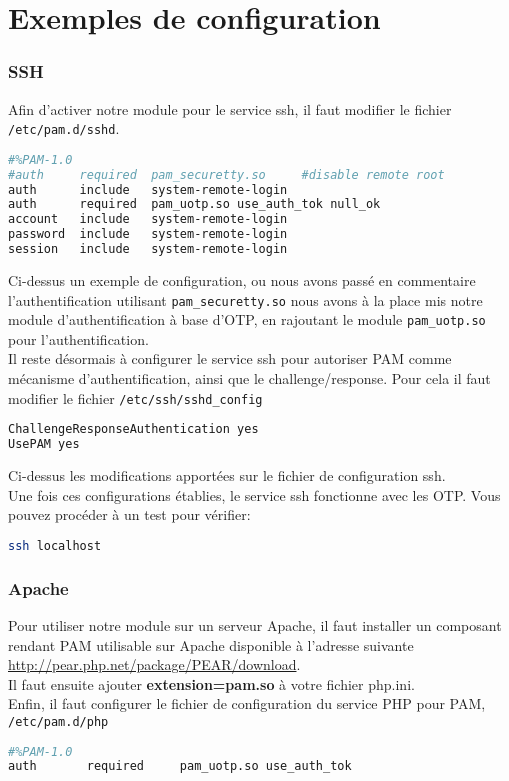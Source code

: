 \documentclass{"../../../res/univ-projet"}
\begin{document}
\newpage

\part{Exemples de configuration}
\section{SSH}
Afin d'activer notre module pour le service ssh, il faut modifier le fichier \verb?/etc/pam.d/sshd?.
\begin{lstlisting}[language=bash, backgroundcolor=\color{black}, basicstyle=\color{white}]
#%PAM-1.0
#auth     required  pam_securetty.so     #disable remote root
auth      include   system-remote-login
auth      required  pam_uotp.so use_auth_tok null_ok
account   include   system-remote-login
password  include   system-remote-login
session   include   system-remote-login
\end{lstlisting}
Ci-dessus un exemple de configuration, ou nous avons passé en commentaire l'authentification utilisant
\verb?pam_securetty.so? nous avons à la place mis notre module d'authentification à base d'OTP, en rajoutant le 
module \verb?pam_uotp.so? pour l'authentification.\\
Il reste désormais à configurer le service ssh pour autoriser PAM comme mécanisme d'authentification, 
ainsi que le challenge/response. Pour cela il faut modifier le fichier \verb?/etc/ssh/sshd_config?
\begin{lstlisting}[language=bash, backgroundcolor=\color{black}, basicstyle=\color{white}]
ChallengeResponseAuthentication yes
UsePAM yes
\end{lstlisting}
Ci-dessus les modifications apportées sur le fichier de configuration ssh.\\
Une fois ces configurations établies, le service ssh fonctionne avec les OTP.
Vous pouvez procéder à un test pour vérifier:
\begin{lstlisting}[language=bash, backgroundcolor=\color{black}, basicstyle=\color{white}]
ssh localhost
\end{lstlisting}

\newpage

\section{Apache}
Pour utiliser notre module sur un serveur Apache, il faut installer un composant rendant PAM utilisable
sur Apache disponible à l'adresse suivante 
\href{http://pear.php.net/package/PEAR/download}{http://pear.php.net/package/PEAR/download}.\\
Il faut ensuite ajouter \textbf{extension=pam.so} à votre fichier php.ini.\\
Enfin, il faut configurer le fichier de configuration du service PHP pour PAM, \verb?/etc/pam.d/php?
\begin{lstlisting}[language=bash, backgroundcolor=\color{black}, basicstyle=\color{white}]
#%PAM-1.0
auth       required     pam_uotp.so use_auth_tok
\end{lstlisting}
\end{document}
